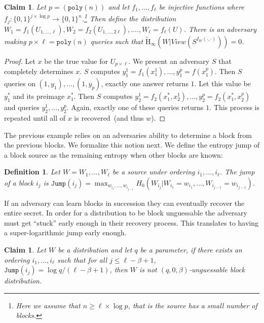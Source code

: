 \documentclass[11pt]{article}
\newcommand{\zo}{\ensuremath{\{0, 1\}}}
\newcommand{\poly}{\ensuremath{\mathtt{poly}}\xspace}
\newcommand{\Hav}{\tilde{\mathrm{H}}_\infty}
\newtheorem{definition}[theorem]{Definition}
\newtheorem{claim}[theorem]{Claim}
\begin{document}
\begin{claim}
Let $p = (\poly(n))$ and let $f_1,..., f_{\ell}$ be injective functions where $f_j:\zo^{j\times \log p}\rightarrow \zo^n$.\footnote{Here we assume that $n\ge \ell \times \log p$, that is the source has a small number of blocks.}  Then define the distribution $W_1 = f_1(U_{1,...,\ell}), W_2 = f_2(U_{1,..., 2\ell}),...., W_\ell = f_\ell(U)$.  There is an adversary making $p\times \ell = \poly(n)$ queries such that $\Hav(W | View(S^{I_W(\cdot, \cdot)})) = 0$.
\end{claim}
\begin{proof}
Let $x$ be the true value for $U_{p\times \ell}$.
We present an adversary $S$ that completely determines $x$.  $S$ computes $y_1^1 = f_1(x_1^1),..., y_1^p = f(x_1^p)$.  Then $S$ queries on $(1, y_1),..., (1, y_p)$, exactly one answer returns $1$.  Let this value be $y_1^*$ and its preimage $x_1^*$.  Then $S$ computes $y_2^1 = f_2(x_1^*,x_2^1), ..., y_2^p= f_2(x_1^*, x_2^p)$ and queries $y_2^1,..., y_2^p$.  Again, exactly one of these queries returns $1$.  This process is repeated until all of $x$ is recovered~(and thus $w$).  %
\end{proof}

The previous example relies on an adversaries ability to determine a block from the previous blocks.  We formalize this notion next.  We define the entropy jump of a block source as the remaining entropy when other blocks are known:

\begin{definition}
Let $W = W_1,..., W_\ell$ be a source under ordering $i_1,..., i_\ell$.  The \emph{jump} of a block $i_j$ is $\mathtt{Jump}(i_j) = \max_{w_{i_1},..., w_{i_{j-1}}} H_0 (W_{i_j} | W_{i_1} = w_{i_1} ,..., W_{i_{j-1}} = w_{i_{j-1}})$.
\end{definition}

If an adversary can learn blocks in succession they can eventually recover the entire secret.  In order for a distribution to be block unguessable the adversary must get ``stuck'' early enough in their recovery process.  This translates to having a super-logarithmic jump early enough.

\begin{claim}
Let $W$ be a distribution and let $q$ be a parameter, if there exists an ordering $i_1,..., i_\ell$ such that for all $j\le \ell-\beta +1$, $\mathtt{Jump}(i_j) = \log q /(\ell-\beta+1)$, then $W$ is not $(q, 0, \beta)$-unguessable block distribution.
\end{claim}
\end{document}
